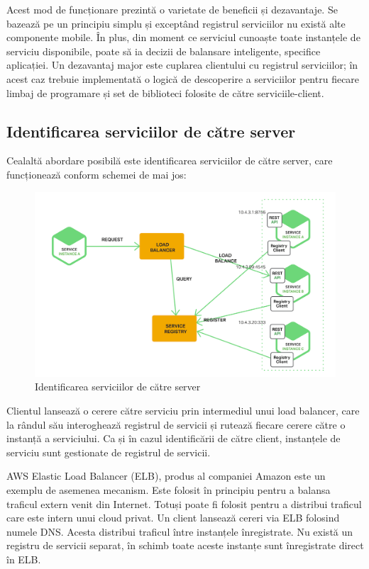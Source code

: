 \documentclass[12pt, a4paper, oneside, romanian]{teza-upb}
\begin{document}
Acest mod de funcționare prezintă o varietate de beneficii și dezavantaje. Se bazează pe un principiu simplu și exceptând registrul serviciilor nu există alte componente mobile. În plus, din moment ce serviciul cunoaște toate instanțele de serviciu disponibile, poate să ia decizii de balansare inteligente, specifice aplicației. Un dezavantaj major este cuplarea clientului cu registrul serviciilor; în acest caz trebuie implementată o logică de descoperire a serviciilor pentru fiecare limbaj de programare și set de biblioteci folosite de către serviciile-client. 

\subsection{Identificarea serviciilor de către server}

Cealaltă abordare posibilă este identificarea serviciilor de către server, care funcționează conform schemei de mai jos:

\begin{figure}[ht]
\centering
\includegraphics[scale=0.22]{img/Richardson-microservices-part4-3_server-side-pattern.png}
\caption{Identificarea serviciilor de către server}
\label{fig:arhi_componente}
\end{figure}

Clientul lansează o cerere către serviciu prin intermediul unui load balancer, care la rândul său interoghează registrul de servicii și rutează fiecare cerere către o instanță a serviciului. Ca și în cazul identificării de către client, instanțele de serviciu sunt gestionate de registrul de servicii. 

AWS Elastic Load Balancer (ELB), produs al companiei Amazon este un exemplu de asemenea mecanism. Este folosit în principiu pentru a balansa traficul extern venit din Internet. Totuși poate fi folosit pentru a distribui traficul care este intern unui cloud privat. Un client lansează cereri via ELB folosind numele DNS. Acesta distribui traficul între instanțele înregistrate. Nu există un registru de servicii separat, în schimb toate aceste instanțe sunt înregistrate direct în ELB.
\end{document}
